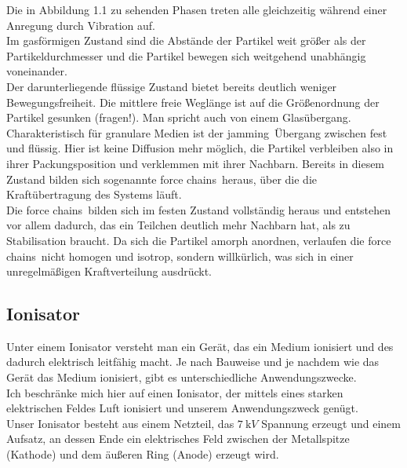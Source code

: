 Die in Abbildung 1.1 zu sehenden Phasen treten alle gleichzeitig während einer Anregung durch Vibration auf. \\
Im gasförmigen Zustand sind die Abstände der Partikel weit größer als der Partikeldurchmesser und die Partikel bewegen sich weitgehend unabhängig voneinander. \\
Der darunterliegende flüssige Zustand bietet bereits deutlich weniger Bewegungsfreiheit. Die mittlere freie Weglänge ist auf die Größenordnung der Partikel gesunken (fragen!). Man spricht auch von einem Glasübergang. \\
Charakteristisch für granulare Medien ist der \glqq jamming\grqq \ Übergang zwischen fest und flüssig. Hier ist keine Diffusion mehr möglich, die Partikel verbleiben also in ihrer Packungsposition und verklemmen mit ihrer Nachbarn. Bereits in diesem Zustand bilden sich sogenannte \glqq force chains\grqq \ heraus, über die die Kraftübertragung des Systems läuft. \\
Die \glqq force chains\grqq \ bilden sich im festen Zustand vollständig heraus und entstehen vor allem dadurch, das ein Teilchen deutlich mehr Nachbarn hat, als zu Stabilisation braucht. Da sich die Partikel amorph anordnen, verlaufen die \glqq force chains\grqq \ nicht homogen und isotrop, sondern willkürlich, was sich in einer unregelmäßigen Kraftverteilung ausdrückt.



\subsection{Ionisator}

Unter einem Ionisator versteht man ein Gerät, das ein Medium ionisiert und des dadurch elektrisch leitfähig macht. Je nach Bauweise und je nachdem wie das Gerät das Medium ionisiert, gibt es unterschiedliche Anwendungszwecke. \\
Ich beschränke mich hier auf einen Ionisator, der mittels eines starken elektrischen Feldes Luft ionisiert und unserem Anwendungszweck genügt. \\
Unser Ionisator besteht aus einem Netzteil, das $\SI{7}{\kilo V}$ Spannung erzeugt und einem Aufsatz, an dessen Ende ein elektrisches Feld zwischen der Metallspitze (Kathode) und dem äußeren Ring (Anode) erzeugt wird.



